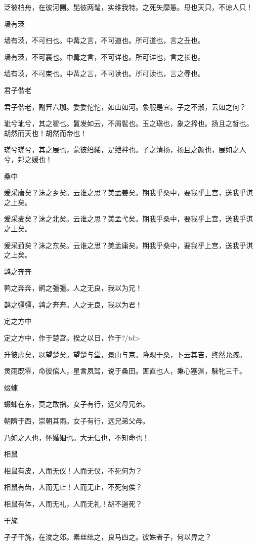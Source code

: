 泛彼柏舟，在彼河侧。髧彼两髦，实维我特。之死矢靡慝。母也天只，不谅人只！

墙有茨

墙有茨，不可扫也。中冓之言，不可道也。所可道也，言之丑也。

墙有茨，不可襄也。中冓之言，不可详也。所可详也，言之长也。

墙有茨，不可束也。中冓之言，不可读也。所可读也，言之辱也。

君子偕老

君子偕老，副笄六珈。委委佗佗，如山如河。象服是宜。子之不淑，云如之何？

玼兮玼兮，其之翟也。鬒发如云，不屑髢也。玉之瑱也，象之揥也。扬且之晳也。胡然而天也！胡然而帝也！

瑳兮瑳兮，其之展也，蒙彼绉絺，是绁袢也。子之清扬，扬且之颜也，展如之人兮，邦之媛也！

桑中

爰采唐矣？沬之乡矣。云谁之思？美孟姜矣。期我乎桑中，要我乎上宫，送我乎淇之上矣。

爰采麦矣？沬之北矣。云谁之思？美孟弋矣。期我乎桑中，要我乎上宫，送我乎淇之上矣。

爰采葑矣？沬之东矣。云谁之思？美孟庸矣。期我乎桑中，要我乎上宫，送我乎淇之上矣。

鹑之奔奔

鹑之奔奔，鹊之彊彊。人之无良，我以为兄！

鹊之彊彊，鹑之奔奔。人之无良，我以为君！

定之方中

定之方中，作于楚宫。揆之以日，作于?/td> 
 
 

升彼虚矣，以望楚矣。望楚与堂，景山与京。降观于桑，卜云其吉，终然允臧。

灵雨既零，命彼倌人，星言夙驾，说于桑田。匪直也人，秉心塞渊，騋牝三千。

蝃蝀

蝃蝀在东，莫之敢指。女子有行，远父母兄弟。

朝隮于西，崇朝其雨。女子有行，远兄弟父母。

乃如之人也，怀婚姻也。大无信也，不知命也！

相鼠

相鼠有皮，人而无仪！人而无仪，不死何为？

相鼠有齿，人而无止！人而无止，不死何俟？

相鼠有体，人而无礼，人而无礼！胡不遄死？

干旄

孑孑干旄，在浚之郊。素丝纰之，良马四之。彼姝者子，何以畀之？

